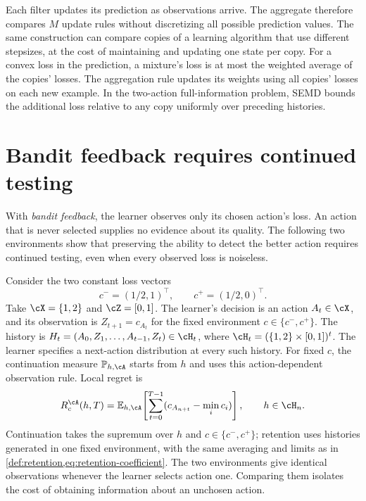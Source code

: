 \documentclass[11pt,twoside]{article}
\newcommand{\E}{\mathbb E}
\renewcommand{\P}{\mathbb P}
\theoremstyle{definition}
\theoremstyle{remark}
\begin{document}
Each filter updates its prediction as observations arrive. The aggregate
therefore compares $M$ update rules without discretizing all possible
prediction values. The same construction can compare copies of a learning
algorithm that use different stepsizes, at the cost of maintaining and
updating one state per copy.
For a convex loss in the prediction, a mixture's loss is at most the
weighted average of the copies' losses. The aggregation rule updates its
weights using all copies' losses on each new example. In the two-action
full-information problem, SEMD bounds the additional loss relative to any
copy uniformly over preceding histories.
\label{en:stepsize-aggregation}

\section{Bandit feedback requires continued testing}
\label{sec:bandit-testing}

With \emph{bandit feedback}, the learner observes only its chosen action's
loss. An action that is never selected supplies no evidence about its
quality. The following two environments show that preserving the ability
to detect the better action requires continued testing, even when every
observed loss is noiseless.

Consider the two constant loss vectors
\[
 c^-=(1/2,1)^\top,\qquad c^+=(1/2,0)^\top.
\]
Take $\cX=\{1,2\}$ and $\cZ=[0,1]$. The learner's decision is an action
$A_t\in\cX$, and its observation is $Z_{t+1}=c_{A_t}$ for the fixed environment
$c\in\{c^-,c^+\}$. The history is
$H_t=(A_0,Z_1,\ldots,A_{t-1},Z_t)\in\cH_t$, where
$\cH_t=(\{1,2\}\times[0,1])^t$. The learner specifies a next-action
distribution at every such history.
For fixed $c$, the continuation measure $\P_{h,\cA}$ starts from $h$
and uses this action-dependent observation rule. Local regret is
\[
 R_c^\cA(h,T)=\E_{h,\cA}\!\left[\sum_{t=0}^{T-1}
       (c_{A_{n+t}}-\min_i c_i)\right],\qquad h\in\cH_n.
\]
Continuation takes the supremum over $h$ and $c\in\{c^-,c^+\}$;
retention uses histories generated in one fixed environment, with the same
averaging and limits as in \cref{def:retention,eq:retention-coefficient}.
The two environments give identical observations whenever the learner
selects action one. Comparing them isolates the cost of obtaining
information about an unchosen action.
\end{document}
